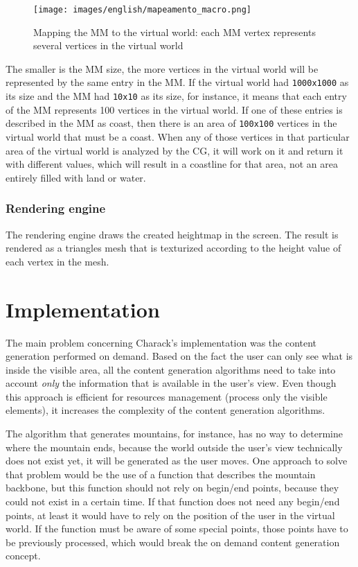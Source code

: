 \documentclass[10pt, conference, compsocconf]{IEEEtran}
\begin{document}
\begin{figure}
\centering
\texttt{[image: images/english/mapeamento\_macro.png]}
\caption{Mapping the MM to the virtual world: each MM vertex represents several vertices in the virtual world}
\label{fig:mapeamento_macro}
\end{figure}

The smaller is the MM size, the more vertices in the virtual world will be represented by the same entry in the MM. If the virtual world had {\tt 1000x1000} as its size and the MM had {\tt 10x10} as its size, for instance, it means that each entry of the MM represents 100 vertices in the virtual world. If one of these entries is described in the MM as coast, then there is an area of {\tt 100x100} vertices in the virtual world that must be a coast. When any of those vertices in that particular area of the virtual world is analyzed by the CG, it will work on it and return it with different values, which will result in a coastline for that area, not an area entirely filled with land or water.


\subsubsection{Rendering engine}

The rendering engine draws the created heightmap in the screen. The result is rendered as a triangles mesh that is texturized according to the height value of each vertex in the mesh.


\section{Implementation}
\label{sec:implementation}

The main problem concerning Charack's implementation was the content generation performed on demand. Based on the fact the user can only see what is inside the visible area, all the content generation algorithms need to take into account {\it only} the information that is available in the user's view. Even though this approach is efficient for resources management (process only the visible elements), it increases the complexity of the content generation algorithms.

The algorithm that generates mountains, for instance, has no way to determine where the mountain ends, because the world outside the user's view technically does not exist yet, it will be generated as the user moves. One approach to solve that problem would be the use of a function that describes the mountain backbone, but this function should not rely on begin/end points, because they could not exist in a certain time. If that function does not need any begin/end points, at least it would have to rely on the position of the user in the virtual world. If the function must be aware of some special points, those points have to be previously processed, which would break the on demand content generation concept.
\end{document}
